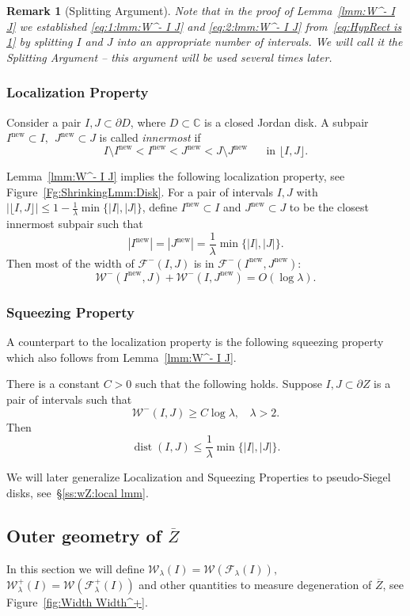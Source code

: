 \documentclass{amsart}
\renewcommand{\sp}{{\ \ }}
\newcommand{\1}{{\mathbb 1 }}
\newcommand{\Fam}{{\mathcal F}}
\newcommand{\Width}{{\mathcal W}}
\newcommand\new{{\operatorname{new}}}
\newcommand{\C}{\mathbb{C}}
\newtheorem{rem}[thm]{Remark}
\theoremstyle{remark}
\numberwithin{equation}{section}
\theoremstyle{definition}
\newcommand{\dist}{\operatorname{dist}}
\begin{document}
\begin{rem}[Splitting Argument]
\label{rem:SplitArg} Note that in the proof of Lemma~\ref{lmm:W^- I J} we established \eqref{eq:1:lmm:W^- I J} and \eqref{eq:2:lmm:W^- I J} from~\eqref{eq:HypRect is 1} by splitting $I$ and $J$ into an appropriate number of intervals. We will call it the \emph{Splitting Argument} -- this argument will be used several times later.
\end{rem}



\subsubsection{Localization Property}
\label{sss:LocProp} Consider a pair $I,J \subset \partial D$, where $D\subset \C$ is a closed Jordan disk. A subpair $I^\new\subset I,\sp J^\new\subset J$ is called \emph{innermost} if 
\[ I\setminus I^\new < I^\new< J^\new< J\setminus J^\new \sp\sp\sp\text{ in }\lfloor I,J\rfloor.\]

Lemma~\ref{lmm:W^- I J} implies the following localization property, see Figure~\ref{Fg:ShrinkingLmm:Disk}.  For a pair of intervals $I,J$  with $|\lfloor I, J\rfloor| \le 1 - \frac{1}{\lambda}\min\{|I|,|J|\}$, define $I^\new \subset I$ and $J^\new \subset J$ to be the closest innermost subpair such that 
\[ |I^\new| =|J^\new| =\frac 1 \lambda \min\{|I|,|J|\}.\]
Then most of the width of $\Fam^-(I,J)$ is in $\Fam^-(I^\new, J^\new)$: 
\[ \Width^-(I^\new, J) + \Width^-(I,J^\new)= O(\log \lambda).\]


\subsubsection{Squeezing Property}
\label{sss:SqueezProp} A counterpart to the localization property is the following squeezing property which also follows from Lemma~\ref{lmm:W^- I J}.

There is a constant $C>0$ such that the following holds. Suppose $I, J\subset \partial Z$ is a pair of intervals such that
\[ \Width^{-}(I,J) \ge C\log \lambda,\sp\sp \lambda>2.\]
Then 
\[\dist(I,J)\le \frac 1 \lambda \min\{|I|,|J|\}.\]

 


We will later generalize Localization and Squeezing Properties to pseudo-Siegel disks, see~\S\ref{ss:wZ:local lmm}.




\subsection{Outer geometry of $\overline Z$} In this section we will define $\Width_\lambda (I)=\Width(\Fam_\lambda(I)),$ $\Width^+_\lambda (I)=\Width(\Fam^+_\lambda(I))$ and other quantities to measure degeneration of $\overline Z$, see Figure~\ref{fig:Width Width^+}. 
\end{document}
